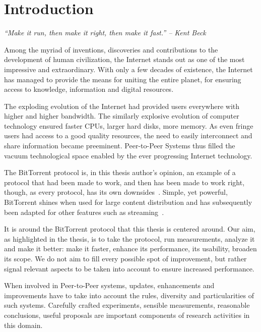 
\chapter{Introduction}
\label{chapter:intro}

\textit{``Make it run, then make it right, then make it fast.'' -- Kent Beck}

Among the myriad of inventions, discoveries and contributions to the
development of human civilization, the Internet stands out as one of the
most impressive and extraordinary. With only a few decades of existence, the
Internet has managed to provide the means for uniting the entire planet, for
ensuring access to knowledge, information and digital resources.

The exploding evolution of the Internet had provided users everywhere with
higher and higher bandwidth. The similarly explosive evolution of computer
technology ensured faster CPUs, larger hard disks, more memory. As even fringe
users had access to a good quality resources, the need to easily interconnect
and share information became preeminent. Peer-to-Peer Systems thus filled the
vacuum technological space enabled by the ever progressing Internet
technology.

The BitTorrent protocol is, in this thesis author's opinion, an example of a
protocol that had been made to work, and then has been made to work right,
though, as every protocol, has its own downsides~\cite{bittorrent-trade-offs}.
Simple, yet powerful, BitTorrent shines when used for large content
distribution and has subsequently been adapted for other features such as
streaming~\cite{bittorrent-streaming}.

It is around the BitTorrent protocol that this thesis is centered around. Our
aim, as highlighted in the thesis, is to take the protocol, run measurements,
analyze it and make it better: make it faster, enhance its performance, its
usability, broaden its scope. We do not aim to fill every possible spot of
improvement, but rather signal relevant aspects to be taken into account to
ensure increased performance.

When involved in Peer-to-Peer systems, updates, enhancements and improvements
have to take into account the rules, diversity and particularities of such
systems. Carefully crafted experiments, sensible measurements, reasonable
conclusions, useful proposals are important components of research activities
in this domain.

